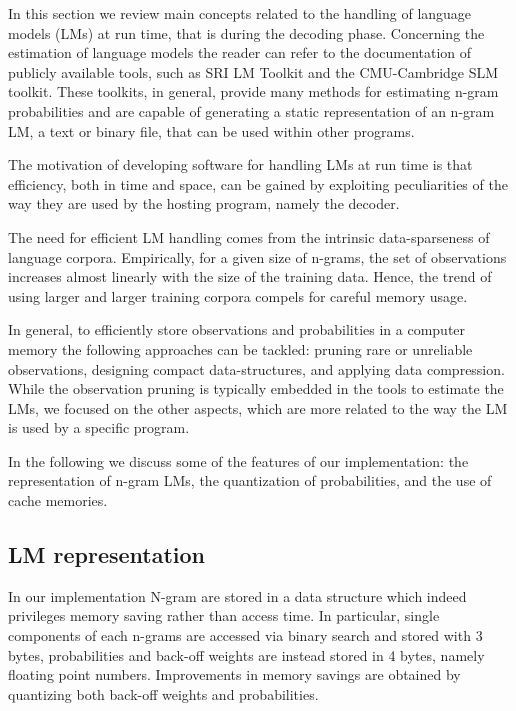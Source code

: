 \documentclass[10pt]{report}
\theoremstyle{plain}
\begin{document}
{In this section we review main concepts related to the handling of language models (LMs) 
at run time, that is during the decoding phase. Concerning the estimation of language 
models the reader can refer to the documentation of publicly available tools, such as 
SRI LM Toolkit and the CMU-Cambridge SLM toolkit.  These toolkits, in general, provide many 
methods for estimating n-gram probabilities and are capable of generating  a static 
representation of an n-gram LM, a text or binary file, that can  be used within other programs.   

The motivation of developing software for handling LMs at run time is that efficiency, both 
in time and space, can be gained by exploiting peculiarities  of the way they are used by the 
hosting program, namely the decoder.  

The need for efficient LM handling comes from the  intrinsic data-sparseness of language corpora. 
Empirically, for a given size of n-grams,   the set of
observations increases  almost linearly with the size  of the training
data.  Hence, the trend of using larger and larger training corpora compels for careful memory
usage.

In general, to efficiently  store observations and probabilities in a
computer  memory the  following approaches  can be  tackled:  pruning  rare or unreliable observations, designing compact data-structures,  and applying data compression. While the observation pruning is typically embedded in the tools to estimate the LMs, we focused
on the other aspects, which are more related to the way the LM is used by a specific program.

In the following we discuss some of the features of our implementation: the representation of 
n-gram LMs, the quantization of probabilities, and  the use of cache memories. 

\subsection{LM representation}
In our implementation N-gram are stored in a data structure which indeed privileges memory
saving rather than access time.  In particular, single components of each n-grams are accessed 
via binary search and stored with 3 bytes, probabilities and back-off weights are instead stored
in 4 bytes, namely  floating point numbers. Improvements in memory savings are obtained by 
quantizing both back-off weights and probabilities. 

}
\end{document}
